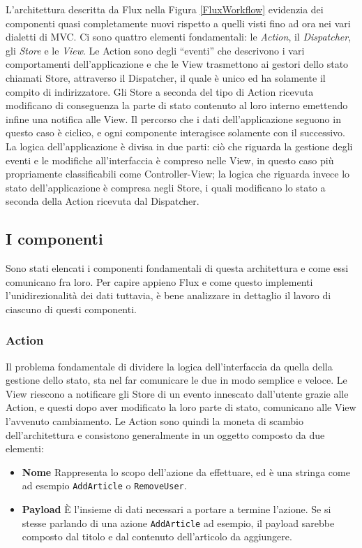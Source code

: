 L'architettura descritta da Flux nella Figura \ref{FluxWorkflow} evidenzia dei componenti quasi completamente nuovi rispetto a quelli visti fino ad ora nei vari dialetti di MVC. Ci sono quattro elementi fondamentali: le \textit{Action}, il \textit{Dispatcher}, gli \textit{Store} e le \textit{View}. Le Action sono degli “eventi” che descrivono i vari comportamenti dell'applicazione e che le View trasmettono ai gestori dello stato chiamati Store, attraverso il Dispatcher, il quale è unico ed ha solamente il compito di indirizzatore. Gli Store a seconda del tipo di Action ricevuta modificano di conseguenza la parte di stato contenuto al loro interno emettendo infine una notifica alle View. 
Il percorso che i dati dell'applicazione seguono in questo caso è ciclico, e ogni componente interagisce solamente con il successivo.
La logica dell'applicazione è divisa in due parti: ciò che riguarda la gestione degli eventi e le modifiche all'interfaccia è compreso nelle View, in questo caso più propriamente classificabili come Controller-View; la logica che riguarda invece lo stato dell'applicazione è compresa negli Store, i quali modificano lo stato a seconda della Action ricevuta dal Dispatcher.

\subsection{I componenti}
\label{FluxComponents}
Sono stati elencati i componenti fondamentali di questa architettura e come essi comunicano fra loro. Per capire appieno Flux e come questo implementi l'unidirezionalità dei dati tuttavia, è bene analizzare in dettaglio il lavoro di ciascuno di questi componenti.

\subsubsection*{Action}
Il problema fondamentale di dividere la logica dell'interfaccia da quella della gestione dello stato, sta nel far comunicare le due in modo semplice e veloce. Le View riescono a notificare gli Store di un evento innescato dall'utente grazie alle Action, e questi dopo aver modificato la loro parte di stato, comunicano alle View l'avvenuto cambiamento. Le Action sono quindi la moneta di scambio dell'architettura e consistono generalmente in un oggetto composto da due elementi:

    \begin{itemize}
        \item \textbf{Nome} Rappresenta lo scopo dell'azione da effettuare, ed è una stringa come ad esempio \texttt{AddArticle} o \texttt{RemoveUser}. 
        \item \textbf{Payload} È l'insieme di dati necessari a portare a termine l'azione. Se si stesse parlando di una azione \texttt{AddArticle} ad esempio, il payload sarebbe composto dal titolo e dal contenuto dell'articolo da aggiungere.
    \end{itemize}

